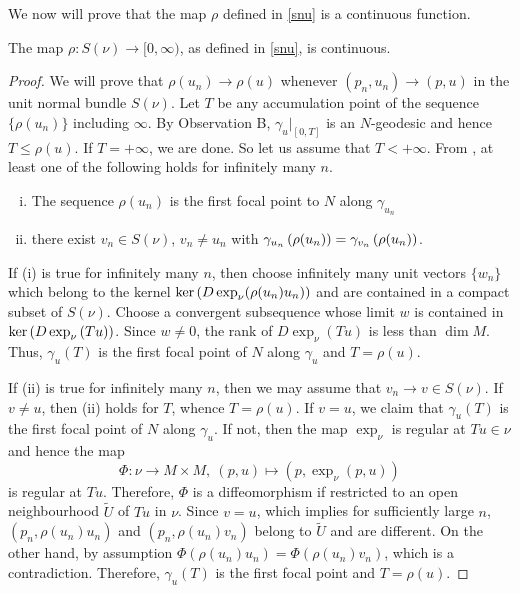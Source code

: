 \hf We now will prove that the map $\rho$ defined in \ref{snu} is a continuous function.
\begin{prop}\label{snucts}
    The map $\rho:S(\nu)\to [0,\infty)$, as defined in \eqref{snu}, is continuous.
\end{prop}
\begin{proof}
    We will prove that $\rho(u_n)\to \rho(u)$ whenever $(p_n,u_n)\to (p,u)$ in the unit normal bundle $S(\nu)$. Let $T$ be any accumulation point of the sequence $\{\rho(u_n)\}$ including $\infty$. By Observation B, $\gamma_{u}|_{[0,T]}$ is an $N$-geodesic and hence $T\le \rho(u)$. If $T=+\infty$, we are done. So let us assume that $T<+\infty$. From , at least one of the following holds for infinitely many $n$.
    \begin{enumerate}[(i)]
        \item The sequence $\rho(u_n)$ is the first focal point to $N$ along $\gamma_{u_n}$
        \item  there exist $v_{n}\in S(\nu)$,  $v_{n}\neq u_n$ with $\gamma_{u_n}\left( \rho(u_n) \right) = \gamma_{v_n}\left( \rho(u_n) \right)$.
    \end{enumerate}

    \hf If (i) is true for infinitely many $n$, then choose infinitely many unit vectors $\{w_n\}$ which belong to the kernel $\ker \left( D\exp_{\nu}(\rho(u_n)u_n) \right)$ and are contained in a compact subset of $S(\nu)$. Choose a convergent subsequence whose limit $w$ is contained in $\ker \left( D\exp_{\nu}{(Tu)} \right)$. Since $w\neq 0$, the rank of $D\exp_{\nu}{(Tu)}$ is less than $\dim M$. Thus, $\gamma_{u}(T)$ is the first focal point of $N$ along $\gamma_u$ and $T=\rho(u)$.

    \vspace{0.1cm}
    \hf If (ii) is true for infinitely many $n$, then we may assume that $v_{n}\to v\in S(\nu)$. If $v\neq u$, then  (ii) holds for $T$, whence $T=\rho(u)$. If $v=u$, we claim that $\gamma_{u}(T)$ is the first focal point of $N$ along $\gamma_{u}$. If not, then the map $\exp_{\nu}$ is regular at $Tu\in \nu$ and hence the map 
    \begin{displaymath}
        \Phi:\nu\to M\times M,~(p,u)\mapsto (p,\exp_\nu(p,u))
    \end{displaymath}
    is regular at $Tu$. Therefore, $\Phi$ is a diffeomorphism if restricted to an open neighbourhood $\tilde{U}$ of $Tu$ in $\nu$. Since $v=u$, which implies for sufficiently large $n$,~ $(p_n,\rho(u_n)u_n)$ and $(p_n,\rho(u_n)v_n)$ belong to $\tilde{U}$ and are different. On the other hand, by assumption $\Phi(\rho(u_n)u_n) = \Phi(\rho(u_n)v_n) $, which is a contradiction. Therefore, $\gamma_u(T)$ is the first focal point and $T=\rho(u)$. 
\end{proof}

